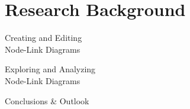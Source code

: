 \documentclass[%
	paper=A4,					%
	twoside=true,				%
	openright,					%
	parskip=full,				%
	chapterprefix=true,			%
	11pt,						%
	headings=normal,			%
	bibliography=totoc,			%
	listof=totoc,				%
	titlepage=on,				%
	captions=tableabove,		%
	draft=false,				%
]{scrbook}%
\begin{document}

\pagestyle{empty}				%
\cleardoublepage

\pagestyle{plain}				%
\cleardoublepage
%
\cleardoublepage
%
\setcounter{tocdepth}{2}		%
\tableofcontents				%
\cleardoublepage

\setcounter{page}{1}			%
\pagestyle{maincontentstyle} 	%




\part{Research Background}
\label{part:background}

	
	


\begin{part}{Creating and Editing \\Node-Link Diagrams}

	
	
	
\end{part}
\begin{part}{Exploring and Analyzing \\Node-Link Diagrams}

	
		
\end{part}
\begin{part}{Conclusions \& Outlook}

%	
	
\end{part}
\cleardoublepage
\end{document}
